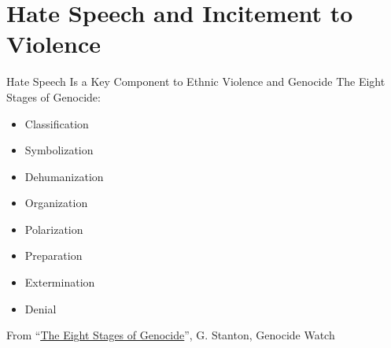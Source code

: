 \documentclass[nobackground,dvipsnames,table,aspectratio=169]{beamer}
\begin{document}
\section{Hate Speech and Incitement to Violence}

\begin{frame}{Hate Speech Is a Key Component to Ethnic Violence and Genocide}
    The Eight Stages of Genocide:
    \begin{itemize}
        \item Classification
        \item Symbolization
        \item Dehumanization
        \item Organization
        \item Polarization
        \item Preparation
        \item Extermination
        \item Denial
    \end{itemize}
    \small
    From “\underline{\href{https://www.keene.edu/academics/ah/cchgs/resources/educational-handouts/the-eight-stages-of-genocide/download/}{The Eight Stages of Genocide}}”, G. Stanton, Genocide Watch
\end{frame}
\end{document}
